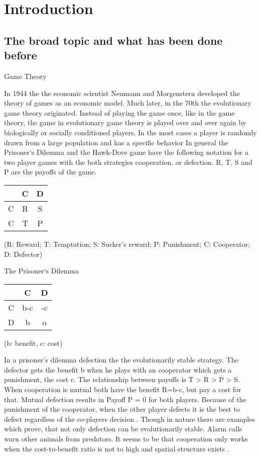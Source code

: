 \section{Introduction}

\subsection{The broad topic and what has been done before}

Game Theory

In 1944 the the economic scientist Neumann and Morgenstern developed the theory of games as an economic model. Much later, in the 70th the evolutionary game theory originated. Instead of playing the game once, like in the game theory, the game in evolutionary game theory is played over and over again by biologically or socially conditioned players. In the most cases a player is randomly drawn from a large population and has a specific behavior \citep{weibull1997}
In general the Prisoner`s Dilemma and the Hawk-Dove game have the following notation for a two player games with the both strategies cooperation, or defection. R, T, S and P are the payoffs of the game.

\begin{tabular}{|c|c|c|}
		\hline  & C & D \\ 
		\hline C & R & S \\ 
		\hline C & T & P \\ 
		\hline 
\end{tabular} 
(R: Reward; T: Temptation; S: Sucker's reward; P: Punishment; C: Cooperator; D: Defector)


The Prisoner`s Dilemma

\begin{tabular}{|c|c|c|}
	\hline  & C & D \\ 
	\hline C & b-c & -c \\ 
	\hline D & b & o \\ 
	\hline 
\end{tabular} 
(b: benefit, c: cost)

In a prisoner's dilemma defection the the evolutionarily stable strategy. The defector gets the benefit b when he plays with an cooperator which gets a punishment, the cost c. The relationship between payoffs is T > R > P > S. When cooperation is mutual both have the benefit R=b-c, but pay a cost for that. Mutual defection results in Payoff P = 0 for both players. Because of the punishment of the cooperator, when the other player defects it is the best to defect regardless of the co-players decision \citep{HauertandDoebeli2004}. Though in nature there are examples which prove, that not only defection can be evolutionarily stable. Alarm calls warn other animals from predators. It seems to be that cooperation only works when the cost-to-benefit ratio is not to high and spatial structure exists \citep{clutton1999}.

